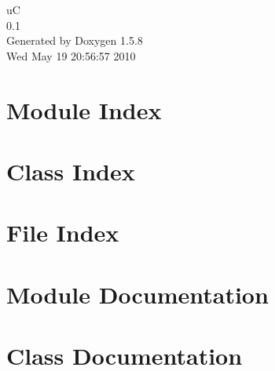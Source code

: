 \documentclass[a4paper]{book}
\begin{document}
\begin{titlepage}
\vspace*{7cm}
\begin{center}
{\Large uC \\[1ex]\large 0.1 }\\
\vspace*{1cm}
{\large Generated by Doxygen 1.5.8}\\
\vspace*{0.5cm}
{\small Wed May 19 20:56:57 2010}\\
\end{center}
\end{titlepage}
\clearemptydoublepage
{}
\tableofcontents
\clearemptydoublepage
{}
\chapter{Module Index}

\chapter{Class Index}

\chapter{File Index}

\chapter{Module Documentation}











\chapter{Class Documentation}




























\end{document}
